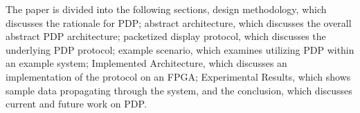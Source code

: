 The paper is divided into the following sections, design methodology, which discusses the rationale for PDP; abstract architecture, which discusses the overall abstract PDP architecture; packetized display protocol, which discusses the underlying PDP protocol; example scenario, which examines utilizing PDP within an example system; Implemented Architecture, which discusses an implementation of the protocol on an FPGA; Experimental Results, which shows sample data propagating through the system, and the conclusion, which discusses current and future work on PDP.
